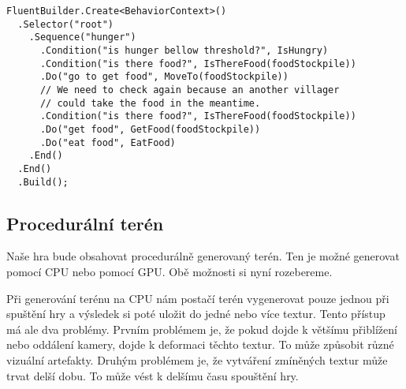 \begin{verbatim}
FluentBuilder.Create<BehaviorContext>()
  .Selector("root")
    .Sequence("hunger")
      .Condition("is hunger bellow threshold?", IsHungry)
      .Condition("is there food?", IsThereFood(foodStockpile))
      .Do("go to get food", MoveTo(foodStockpile))
      // We need to check again because an another villager
      // could take the food in the meantime.
      .Condition("is there food?", IsThereFood(foodStockpile))
      .Do("get food", GetFood(foodStockpile))
      .Do("eat food", EatFood)
    .End()
  .End()
  .Build();
\end{verbatim}











\subsection{Procedurální terén}
Naše hra bude obsahovat procedurálně generovaný terén. Ten je možné generovat pomocí CPU nebo pomocí GPU. Obě možnosti si nyní rozebereme.

Při generování terénu na CPU nám postačí terén vygenerovat pouze jednou při spuštění hry a výsledek si poté uložit do jedné nebo více textur. Tento přístup má ale dva problémy. Prvním problémem je, že pokud dojde k většímu přiblížení nebo oddálení kamery, dojde k deformaci těchto textur. To může způsobit různé vizuální artefakty. Druhým problémem je, že vytváření zmíněných textur může trvat delší dobu. To může vést k delšímu času spouštění hry.

